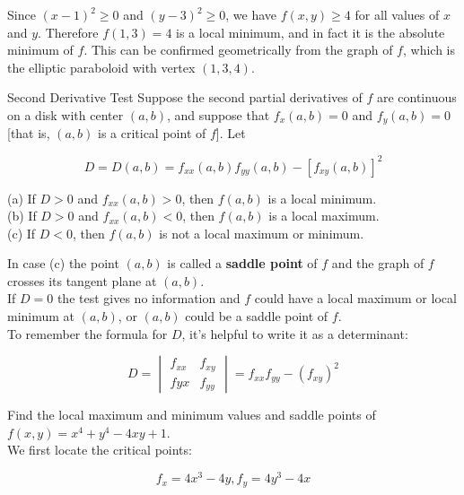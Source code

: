         Since $(x-1)^2 \geq 0$ and $(y-3)^2 \geq 0$, we have $f(x,y) \geq 4$ for all values of $x$ and $y$. Therefore $f(1,3) = 4$ is a local minimum, and in fact it is the absolute minimum of $f$. This can be confirmed
        geometrically from the graph of $f$, which is the elliptic paraboloid with vertex $(1,3,4)$.

        \begin{axiom}{Second Derivative Test}
            Suppose the second partial derivatives of $f$ are continuous on a disk with center $(a,b)$, and suppose that $f_x (a,b) = 0$ and $f_y (a,b) = 0$ [that is, $(a,b)$ is a critical point of $f$]. Let

            \[
                D = D(a,b) = f_{xx} (a,b) f_{yy} (a,b) - [f_{xy} (a,b)]^2
            \]

            (a) If $D > 0$ and $f_{xx} (a,b) > 0$, then $f(a,b)$ is a local minimum. \\
            (b) If $D > 0$ and $f_{xx} (a,b) < 0$, then $f(a,b)$ is a local maximum. \\
            (c) If $D < 0$, then $f(a,b)$ is not a local maximum or minimum.
        \end{axiom}

        In case (c) the point $(a,b)$ is called a \textbf{saddle point} of $f$ and the graph of $f$ crosses its tangent plane at $(a,b)$. \\

        If $D = 0$ the test gives no information and $f$ could have a local maximum or local minimum at $(a,b)$, or $(a,b)$ could be a saddle point of $f$. \\

        To remember the formula for $D$, it's helpful to write it as a determinant:

        \[
            D =
            \begin{vmatrix}
                f_{xx}  & f_{xy} \\
                f{yx}   & f_{yy}
            \end{vmatrix}
            = f_{xx} f_{yy} - \left(f_{xy}\right)^2
        \]

        \textit{} Find the local maximum and minimum values and saddle points of $f(x,y) = x^4 + y^4 - 4xy + 1$. \\

        We first locate the critical points:

        \[
            f_x = 4x^3 - 4y, f_y = 4y^3 - 4x
        \]

